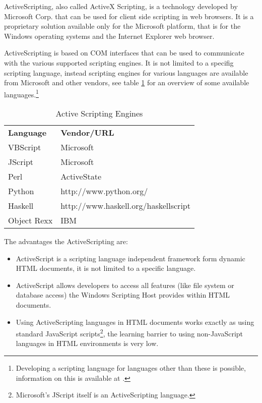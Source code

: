 ActiveScripting, also called ActiveX Scripting, is a technology developed by Microsoft Corp. that can be used for client side scripting in web browsers. It is a proprietary solution available only for the Microsoft platform, that is for the Windows operating systems and the Internet Explorer web browser.

ActiveScripting is based on COM interfaces that can be used to communicate with the various supported scripting engines. It is not limited to a specifig scripting language, instead scripting engines for various languages are available from Microsoft and other vendors, see table  \ref{tab:ActiveScriptingEngines} for an overview of some available languages.\footnote{Developing a scripting language for languages other than these is possible, information on this is available at \cite{MsCreateSE}.}


\begin{table}
	\centering
		\begin{tabular}{ll}
			\textbf{Language}& \textbf{Vendor/URL} \\
			VBScript & Microsoft \\
			JScript & Microsoft \\
			Perl & ActiveState \\
			Python & \sffamily http://www.python.org/ \\
			Haskell & \sffamily http://www.haskell.org/haskellscript \\
			Object Rexx & IBM \\
			
		\end{tabular}
	\caption{Active Scripting Engines}
	\label{tab:ActiveScriptingEngines}
\end{table}


The advantages the ActiveScripting are:

\begin{itemize}
	\item ActiveScript is a scripting language independent framework form dynamic HTML documents, it is not limited to a specific language.
	\item ActiveScript allows developers to access all features (like file system or database access) the Windows Scripting Host provides within HTML documents.
	\item Using ActiveScripting languages in HTML documents works exactly as using standard JavaScript scripts\footnote{Microsoft's JScript itself is an ActiveScripting language.}, the learning barrier to using non-JavaScript languages in HTML environments is very low.
\end{itemize}

